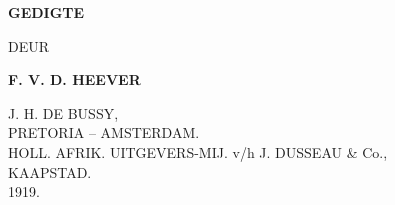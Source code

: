 \begin{titlepage}
	\begin{center}
		\vspace*{1cm}
		
		\textbf{GEDIGTE}
		
		\vspace{0.5cm}
		DEUR
		
		\vspace{1.5cm}
		
		\textbf{F. V. D. HEEVER}
		
		\vfill
		
		J. H. DE BUSSY, \\
		PRETORIA -- AMSTERDAM. \\
		HOLL. AFRIK. UITGEVERS-MIJ. v/h J. DUSSEAU \& Co., \\
		KAAPSTAD. \\
		1919. \\
		
		\vspace{0.8cm}
		
	\end{center}
\end{titlepage}
